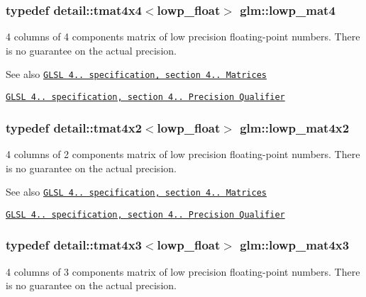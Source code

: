 \subsubsection[{lowp\+\_\+mat4}]{\setlength{\rightskip}{0pt plus 5cm}typedef detail\+::tmat4x4$<$lowp\+\_\+float$>$ {\bf glm\+::lowp\+\_\+mat4}}\label{group__core__precision_ga39e75439a03361f4407feab2e2eb5f93}
4 columns of 4 components matrix of low precision floating-\/point numbers. There is no guarantee on the actual precision.

\begin{DoxySeeAlso}{See also}
\href{http://www.opengl.org/registry/doc/GLSLangSpec.4.20.8.pdf}{\tt G\+L\+S\+L 4.. specification, section 4.. Matrices} 

\href{http://www.opengl.org/registry/doc/GLSLangSpec.4.20.8.pdf}{\tt G\+L\+S\+L 4.. specification, section 4.. Precision Qualifier} 
\end{DoxySeeAlso}
\hypertarget{group__core__precision_gaf8f0828066f6c6fbd2c815832743e401}{}
\subsubsection[{lowp\+\_\+mat4x2}]{\setlength{\rightskip}{0pt plus 5cm}typedef detail\+::tmat4x2$<$lowp\+\_\+float$>$ {\bf glm\+::lowp\+\_\+mat4x2}}\label{group__core__precision_gaf8f0828066f6c6fbd2c815832743e401}
4 columns of 2 components matrix of low precision floating-\/point numbers. There is no guarantee on the actual precision.

\begin{DoxySeeAlso}{See also}
\href{http://www.opengl.org/registry/doc/GLSLangSpec.4.20.8.pdf}{\tt G\+L\+S\+L 4.. specification, section 4.. Matrices} 

\href{http://www.opengl.org/registry/doc/GLSLangSpec.4.20.8.pdf}{\tt G\+L\+S\+L 4.. specification, section 4.. Precision Qualifier} 
\end{DoxySeeAlso}
\hypertarget{group__core__precision_ga072d9727aa59df856b83cfc01cb131bf}{}
\subsubsection[{lowp\+\_\+mat4x3}]{\setlength{\rightskip}{0pt plus 5cm}typedef detail\+::tmat4x3$<$lowp\+\_\+float$>$ {\bf glm\+::lowp\+\_\+mat4x3}}\label{group__core__precision_ga072d9727aa59df856b83cfc01cb131bf}
4 columns of 3 components matrix of low precision floating-\/point numbers. There is no guarantee on the actual precision.

